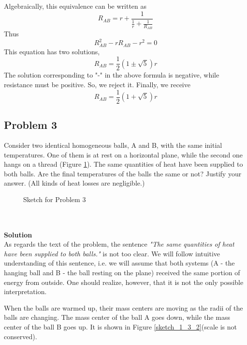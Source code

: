 \documentclass[12pt,a4paper]{book}
\begin{document}
	Algebraically, this equivalence can be written as
	\begin{equation*}
		R_{AB}=r+\frac{1}{\frac{1}{r}+\frac{1}{R_{AB}}}
	\end{equation*}
	Thus
	\begin{equation*}
		R_{AB}^2-rR_{AB}-r^2=0
	\end{equation*}
	This equation has two solutions,
	\begin{equation*}
		R_{AB}=\frac{1}{2}(1\pm\sqrt{5})r
	\end{equation*}
	The solution corresponding to "-" in the above formula is negative, while resistance must be positive. So, we reject it. Finally, we receive
	\begin{equation}
		R_{AB}=\frac{1}{2}(1+\sqrt{5})r
	\end{equation}
	\subsection*{Problem 3}
	Consider two identical homogeneous balls, A and B, with the same initial temperatures. One of them is at rest on a horizontal plane, while the second one hangs on a thread (Figure \ref{sketch_1_3_1}). The same quantities of heat have been supplied to both balls. Are the final temperatures of the balls the same or not? Justify your answer. (All kinds of heat losses are negligible.)
	\begin{figure}[!hbtp]
		\centering
		\caption{Sketch for Problem 3}
		\label{sketch_1_3_1}
	\end{figure}\\ \\
	\textbf{Solution}\\
	As regards the text of the problem, the sentence \emph{"The same quantities of heat have been supplied to both balls."} is not too clear. We will follow intuitive understanding of this sentence, i.e. we will assume that both systems (A - the hanging ball and B - the ball resting on the plane) received the same portion of energy from outside. One should realize, however, that it is not the only possible interpretation.\par
	When the balls are warmed up, their mass centers are moving as the radii of the balls are changing. The mass center of the ball A goes down, while the mass center of the ball B goes up. It is shown in Figure \ref{sketch_1_3_2}(scale is not conserved).\par
\end{document}
